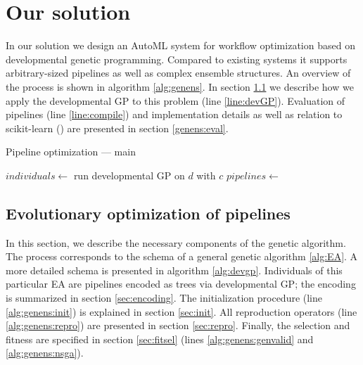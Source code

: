 \chapter{Our solution} \label{our:solution}

In our solution we design an AutoML system for workflow optimization based on
developmental genetic programming. Compared to existing systems it supports 
arbitrary-sized pipelines as well as complex ensemble structures. An overview
of the process is shown in algorithm \ref{alg:genens}. In section
\ref{genens:devGP} we describe how we apply the developmental GP to this
problem (line \ref{line:devGP}). Evaluation of pipelines (line \ref{line:compile})
and implementation details as well as relation to scikit-learn
(\cite{scikit-learn}) are presented in section \ref{genens:eval}.

\begin{algorithm}
\DontPrintSemicolon 
\caption{Pipeline optimization --- main\label{alg:genens}}
  \;
  $individuals \longleftarrow$ run developmental GP on $d$ with $c$ \label{line:devGP} \;
  $pipelines \longleftarrow$  \label{line:compile}
  \;\;
  
\end{algorithm}




\section{Evolutionary optimization of pipelines} \label{genens:devGP}
In this section, we describe the necessary components of the genetic algorithm.
The process corresponds to the schema of a general genetic algorithm
\ref{alg:EA}. A more detailed schema is presented in algorithm \ref{alg:devgp}.
Individuals of this particular EA are pipelines encoded as trees via
developmental GP; the encoding is summarized in section \ref{sec:encoding}.
The initialization procedure (line \ref{alg:genens:init}) is explained in
section \ref{sec:init}. All reproduction operators
(line \ref{alg:genens:repro}) are presented in section \ref{sec:repro}.
Finally, the selection and fitness are specified in section \ref{sec:fitsel}
(lines \ref{alg:genens:genvalid} and \ref{alg:genens:nsga}).


